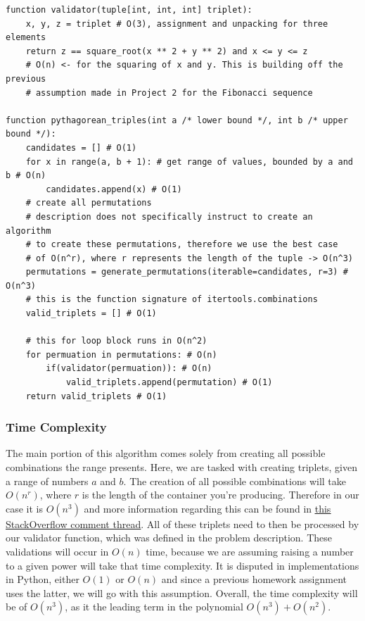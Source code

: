 \documentclass{article}
\begin{document}
\begin{verbatim}
function validator(tuple[int, int, int] triplet):
    x, y, z = triplet # O(3), assignment and unpacking for three elements
    return z == square_root(x ** 2 + y ** 2) and x <= y <= z
    # O(n) <- for the squaring of x and y. This is building off the previous
    # assumption made in Project 2 for the Fibonacci sequence

function pythagorean_triples(int a /* lower bound */, int b /* upper bound */):
    candidates = [] # O(1)
    for x in range(a, b + 1): # get range of values, bounded by a and b # O(n)
        candidates.append(x) # O(1)
    # create all permutations
    # description does not specifically instruct to create an algorithm
    # to create these permutations, therefore we use the best case
    # of O(n^r), where r represents the length of the tuple -> O(n^3)
    permutations = generate_permutations(iterable=candidates, r=3) # O(n^3)
    # this is the function signature of itertools.combinations
    valid_triplets = [] # O(1)

    # this for loop block runs in O(n^2)
    for permuation in permutations: # O(n)
        if(validator(permuation)): # O(n)
            valid_triplets.append(permutation) # O(1)
    return valid_triplets # O(1)
\end{verbatim}

\subsubsection{Time Complexity}

The main portion of this algorithm comes solely from creating all possible combinations the range presents.
Here, we are tasked with creating triplets, given a range of numbers $a$ and $b$.
The creation of all possible combinations will take $O(n^{r})$, where $r$ is the length of the container you're producing.
Therefore in our case it is $O(n^{3})$ and more information regarding this can be found in \href{https://stackoverflow.com/a/20765011}{\underline{this StackOverflow comment thread}}.
All of these triplets need to then be processed by our validator function, which was defined in the problem description.
These validations will occur in $O(n)$ time, because we are assuming raising a number to a given power will take that time complexity.
It is disputed in implementations in Python, either $O(1)$ or $O(n)$ and since a previous homework assignment uses the latter, we will go with this assumption.
Overall, the time complexity will be of $O(n^{3})$, as it the leading term in the polynomial $O(n^{3}) + O(n^{2})$.
\end{document}
